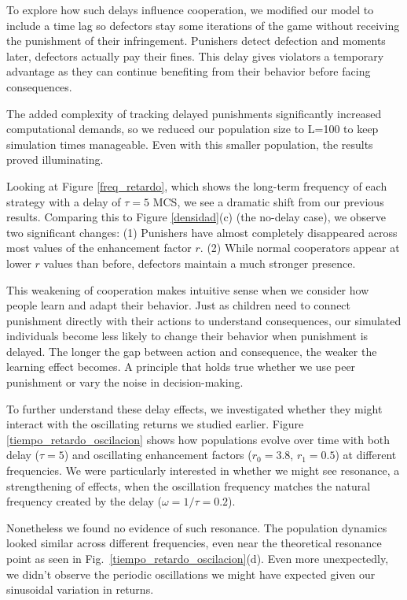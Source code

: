 To explore how such delays influence cooperation, we modified our model to include a time lag so defectors stay some iterations of the game without receiving the punishment of their infringement.  Punishers detect defection and moments later, defectors actually pay their fines. This delay gives violators a temporary advantage as they can continue benefiting from their behavior before facing consequences.

The added complexity of tracking delayed punishments significantly increased computational demands, so we reduced our population size to L=100 to keep simulation times manageable. Even with this smaller population, the results proved illuminating.

Looking at Figure \ref{freq_retardo}, which shows the long-term frequency of each strategy with a delay of $\tau=5$ MCS, we see a dramatic shift from our previous results. Comparing this to Figure \ref{densidad}(c) (the no-delay case), we observe two significant changes: (1) Punishers have almost completely disappeared across most values of the enhancement factor $r$. (2) While normal cooperators appear at lower $r$ values than before, defectors maintain a much stronger presence.

This weakening of cooperation makes intuitive sense when we consider how people learn and adapt their behavior. Just as children need to connect punishment directly with their actions to understand consequences, our simulated individuals become less likely to change their behavior when punishment is delayed. The longer the gap between action and consequence, the weaker the learning effect becomes. A principle that holds true whether we use peer punishment or vary the noise in decision-making.

To further understand these delay effects, we investigated whether they might interact with the oscillating returns we studied earlier. Figure \ref{tiempo_retardo_oscilacion} shows how populations evolve over time with both delay ($\tau=5$) and oscillating enhancement factors ($r_0=3.8$, $r_1=0.5$) at different frequencies. We were particularly interested in whether we might see resonance, a strengthening of effects, when the oscillation frequency matches the natural frequency created by the delay ($\omega=1/\tau=0.2$).

Nonetheless we found no evidence of such resonance. The population dynamics looked similar across different frequencies, even near the theoretical resonance point as seen in Fig.~\ref{tiempo_retardo_oscilacion}(d). Even more unexpectedly, we didn't observe the periodic oscillations we might have expected given our sinusoidal variation in returns.

